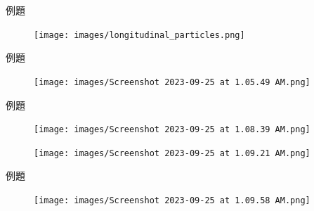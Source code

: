 \documentclass[13pt]{beamer}
\begin{document}
\begin{frame}[t]{例題}
    \begin{figure}
        \centering
        \texttt{[image: images/longitudinal\_particles.png]}


    \end{figure}
\end{frame}

\begin{frame}[t]{例題}
    \begin{figure}
        \centering
        \texttt{[image: images/Screenshot 2023-09-25 at 1.05.49 AM.png]}


    \end{figure}
\end{frame}

\begin{frame}{例題}
    \begin{figure}
        \centering
        \texttt{[image: images/Screenshot 2023-09-25 at 1.08.39 AM.png]}


    \end{figure}
    \begin{figure}
        \centering
        \texttt{[image: images/Screenshot 2023-09-25 at 1.09.21 AM.png]}


    \end{figure}
\end{frame}

\begin{frame}{例題}
    \begin{figure}
        \centering
        \texttt{[image: images/Screenshot 2023-09-25 at 1.09.58 AM.png]}


    \end{figure}
\end{frame}
\end{document}

